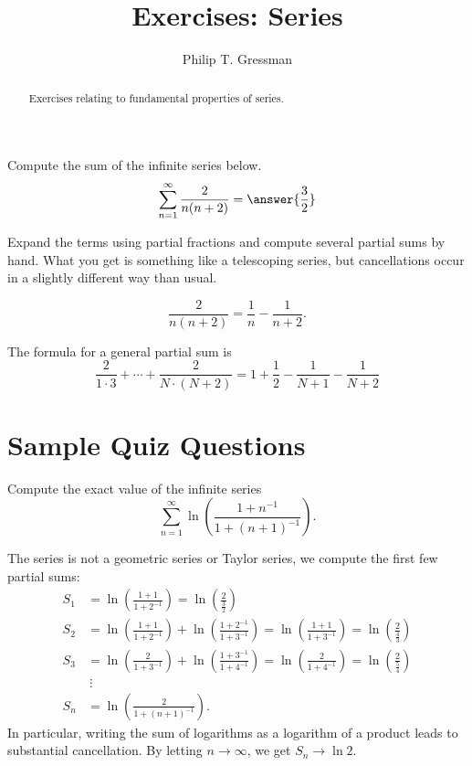 \documentclass{ximera}
\title{Exercises: Series}
\author{Philip T. Gressman}
\begin{document}
\begin{abstract}
Exercises relating to fundamental properties of series.
\end{abstract}
\maketitle

\begin{exercise}
Compute the sum of the infinite series below.
\[ \sum_{n=1}^\infty \frac{2}{n(n+2)} = \answer{\frac{3}{2}} \]
\begin{hint}
Expand the terms using partial fractions and compute several partial sums by hand. What you get is something like a telescoping series, but cancellations occur in a slightly different way than usual.
\begin{hint}
\[ \frac{2}{n(n+2)} = \frac{1}{n} - \frac{1}{n+2}. \]
\begin{hint}
The formula for a general partial sum is
\[ \frac{2}{1 \cdot 3} + \cdots + \frac{2}{N \cdot (N+2)} = 1 + \frac{1}{2} - \frac{1}{N+1} - \frac{1}{N+2} \]
\end{hint}
\end{hint}
\end{hint}
\end{exercise}

\section*{Sample Quiz Questions}

\begin{question}%

Compute the exact value of the infinite series
\[ \sum_{n=1}^\infty \ln \left( \frac{1 + n^{-1}}{1 + (n+1)^{-1}} \right). \]
\begin{multiplechoice}
\end{multiplechoice}
\begin{feedback}
The series is not a geometric series or Taylor series, we compute the first few partial sums:
\[ 
\begin{aligned}
S_1 & = \ln \left( \frac{1 + 1}{1 + 2^{-1}} \right)  = \ln \left( \frac{2}{\frac{3}{2}} \right) \\
S_2 & = \ln \left( \frac{1 + 1}{1 + 2^{-1}} \right)  + \ln \left( \frac{1 + 2^{-1}}{1 + 3^{-1}} \right)  = \ln \left( \frac{1 + 1}{1 + 3^{-1}} \right) = \ln \left( \frac{2}{\frac{4}{3}} \right) \\
S_3 & = \ln \left( \frac{2}{1 + 3^{-1}} \right)  + \ln \left( \frac{1 + 3^{-1}}{1 + 4^{-1}} \right)  = \ln \left( \frac{2}{1 + 4^{-1}} \right) = \ln \left( \frac{2}{\frac{5}{4}} \right) \\
& \ \vdots  \\
S_n & = \ln \left( \frac{2}{1 + (n+1)^{-1}} \right).
 \end{aligned}
\]
In particular, writing the sum of logarithms as a logarithm of a product leads to substantial cancellation.  By letting \(n \rightarrow \infty\), we get \(S_n \rightarrow \ln 2\).
\end{feedback}

\end{question}
\end{document}
